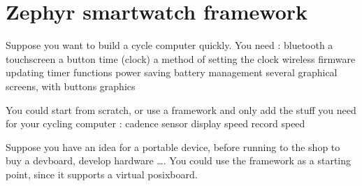 \documentclass[letterpaper,10pt,english]{sphinxmanual}
\begin{document}
\chapter{Zephyr  smartwatch framework}
\label{\detokenize{content:zephyr-smartwatch-framework}}\label{\detokenize{content::doc}}
Suppose you want to build a cycle computer quickly.
You need :
\sphinxhyphen{} bluetooth
\sphinxhyphen{} a touchscreen
\sphinxhyphen{} a button
\sphinxhyphen{} time (clock)
\sphinxhyphen{} a method of setting the clock
\sphinxhyphen{} wireless firmware updating
\sphinxhyphen{} timer functions
\sphinxhyphen{} power saving
\sphinxhyphen{} battery management
\sphinxhyphen{} several graphical screens, with buttons graphics

You could start from scratch, or use a framework and only add the stuff you need for your cycling computer :
\sphinxhyphen{} cadence sensor
\sphinxhyphen{} display speed
\sphinxhyphen{} record speed

Suppose you have an idea for a portable device, before running to the shop to buy a dev\sphinxhyphen{}board, develop hardware ….
You could use the framework as a starting point, since it supports a virtual posix\sphinxhyphen{}board.
\end{document}
